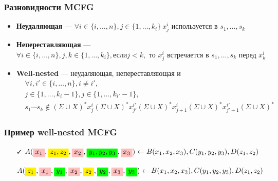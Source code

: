 \documentclass{beamer}
\newcommand{\highlight}[2][yellow]{\mathchoice%
  {\colorbox{#1}{$\displaystyle#2$}}%
  {\colorbox{#1}{$\textstyle#2$}}%
  {\colorbox{#1}{$\scriptstyle#2$}}%
  {\colorbox{#1}{$\scriptscriptstyle#2$}}}%
\begin{document}
\begin{frame}[fragile]

  \frametitle{Разновидности MCFG}
  \begin{itemize}
    \item \textbf{Неудаляющая} --- $\forall i \in \{i,\ldots,n\}, j\in \{1,\ldots,k_i\} \ x^i_j \text{ используется в } s_1,\ldots,s_k $
    \pause
    \item \textbf{Непереставляющая} --- $\forall i \in \{i,\ldots,n\}, j,k\in \{1,\ldots,k_i\}, \text{если} j < k, \text{ то } x^i_j \text{ встречается в } s_1,\ldots,s_k  \text{ перед } x^i_k$
    \pause
    \item \textbf{Well-nested} --- неудаляющая, непереставляющая и
    \begin{align*}
    &\forall i,i' \in \{i,\ldots,n\}, i\neq i', \\
    &j\in \{1,\ldots,k_i-1\}, j\in \{1,\ldots,k_{i'}-1\},\\
    &s_1\cdots s_k \notin (\Sigma \cup X)^* x^i_j (\Sigma \cup X)^* x^{i'}_{j'} (\Sigma \cup X)^* x^i_{j+1} (\Sigma \cup X)^* x^{i'}_{j'+1}(\Sigma \cup X)^*
    \end{align*}
  \end{itemize}
\end{frame}


\begin{frame}[fragile]

  \frametitle{Пример well-nested MCFG}
  \begin{itemize}
    \item[\faCheck] $A(\highlight[pink]{x_1},\highlight{z_1,z_2},\highlight[pink]{x_2},\highlight[green]{y_1,y_2,y_3},\highlight[pink]{x_3}) \leftarrow B(x_1,x_2,x_3),C(y_1,y_2,y_3),D(z_1,z_2)$
    \item[\faTimes] $A(\highlight{z_1},\highlight[pink]{x_1},\highlight[green]{y_1},\highlight[pink]{x_2},\highlight{z_2},\highlight[green]{y_2},\highlight[pink]{x_3},\highlight[green]{y_3}) \leftarrow B(x_1,x_2,x_3),C(y_1,y_2,y_3),D(z_1,z_2)$
  \end{itemize}
\end{frame}
\end{document}
